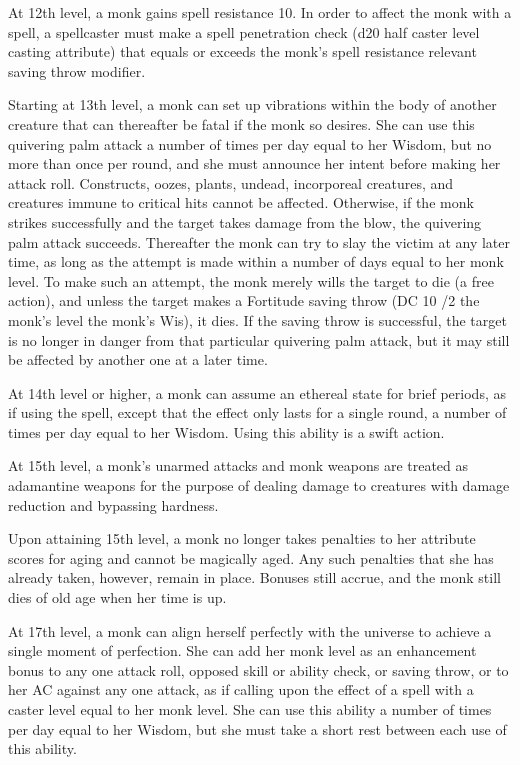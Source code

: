  At 12th level, a monk gains spell resistance 10. In order to affect the monk with a spell, a spellcaster must make a spell penetration check (d20 \add half caster level \add casting attribute) that equals or exceeds the monk's spell resistance \add relevant saving throw modifier.

 Starting at 13th level, a monk can set up vibrations within the body of another creature that can thereafter be fatal if the monk so desires. She can use this quivering palm attack a number of times per day equal to her Wisdom, but no more than once per round, and she must announce her intent before making her attack roll. Constructs, oozes, plants, undead, incorporeal creatures, and creatures immune to critical hits cannot be affected. Otherwise, if the monk strikes successfully and the target takes damage from the blow, the quivering palm attack succeeds. Thereafter the monk can try to slay the victim at any later time, as long as the attempt is made within a number of days equal to her monk level. To make such an attempt, the monk merely wills the target to die (a free action), and unless the target makes a Fortitude saving throw (DC 10 /2 the monk's level \add the monk's Wis), it dies. If the saving throw is successful, the target is no longer in danger from that particular quivering palm attack, but it may still be affected by another one at a later time.

 At 14th level or higher, a monk can assume an ethereal state for brief periods, as if using the  spell, except that the effect only lasts for a single round, a number of times per day equal to her Wisdom. Using this ability is a swift action.

 At 15th level, a monk's unarmed attacks and monk weapons are treated as adamantine weapons for the purpose of dealing damage to creatures with damage reduction and bypassing hardness.

 Upon attaining 15th level, a monk no longer takes penalties to her attribute scores for aging and cannot be magically aged. Any such penalties that she has already taken, however, remain in place. Bonuses still accrue, and the monk still dies of old age when her time is up.

 At 17th level, a monk can align herself perfectly with the universe to achieve a single moment of perfection. She can add her monk level as an enhancement bonus to any one attack roll, opposed skill or ability check, or saving throw, or to her AC against any one attack, as if calling upon the effect of a  spell with a caster level equal to her monk level. She can use this ability a number of times per day equal to her Wisdom, but she must take a short rest between each use of this ability.

